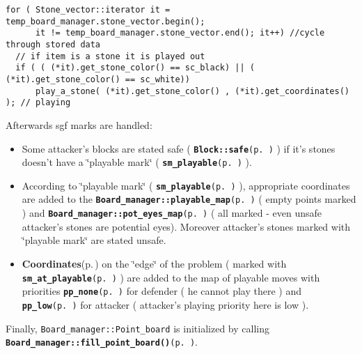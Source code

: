 \footnotesize\begin{verbatim}for ( Stone_vector::iterator it = temp_board_manager.stone_vector.begin(); 
      it != temp_board_manager.stone_vector.end(); it++) //cycle through stored data
  // if item is a stone it is played out 
  if ( ( (*it).get_stone_color() == sc_black) || ( (*it).get_stone_color() == sc_white))  
      play_a_stone( (*it).get_stone_color() , (*it).get_coordinates() ); // playing
\end{verbatim}
\normalsize


Afterwards sgf marks are handled:\begin{itemize}
\item Some attacker's blocks are stated safe ( {\tt {\bf Block::safe}{\rm (p.\,\pageref{classBlock_r4})}} ) if it's stones doesn't have a \char`\"{}playable mark\char`\"{} ( {\tt {\bf sm\_\-playable}{\rm (p.\,\pageref{board_8h_a50a19})}} ).\item According to \char`\"{}playable mark\char`\"{} ( {\tt {\bf sm\_\-playable}{\rm (p.\,\pageref{board_8h_a50a19})}} ), appropriate coordinates are added to the {\tt {\bf Board\_\-manager::playable\_\-map}{\rm (p.\,\pageref{classBoard__manager_r2})}} ( empty points marked ) and {\tt {\bf Board\_\-manager::pot\_\-eyes\_\-map}{\rm (p.\,\pageref{classBoard__manager_o0})}} ( all marked - even unsafe attacker's stones are potential eyes). Moreover attacker's stones marked with \char`\"{}playable mark\char`\"{} are stated unsafe.\item {\bf Coordinates}{\rm (p.\,\pageref{classCoordinates})} on the \char`\"{}edge\char`\"{} of the problem ( marked with {\tt {\bf sm\_\-at\_\-playable}{\rm (p.\,\pageref{board_8h_a50a20})}} ) are added to the map of playable moves with priorities {\tt {\bf pp\_\-none}{\rm (p.\,\pageref{board_8h_a52a33})}} for defender ( he cannot play there ) and {\tt {\bf pp\_\-low}{\rm (p.\,\pageref{board_8h_a52a30})}} for attacker ( attacker's playing priority here is low ).\end{itemize}


Finally, {\tt Board\_\-manager::Point\_\-board} is initialized by calling {\tt {\bf Board\_\-manager::fill\_\-point\_\-board()}{\rm (p.\,\pageref{classBoard__manager_a15})}}.

